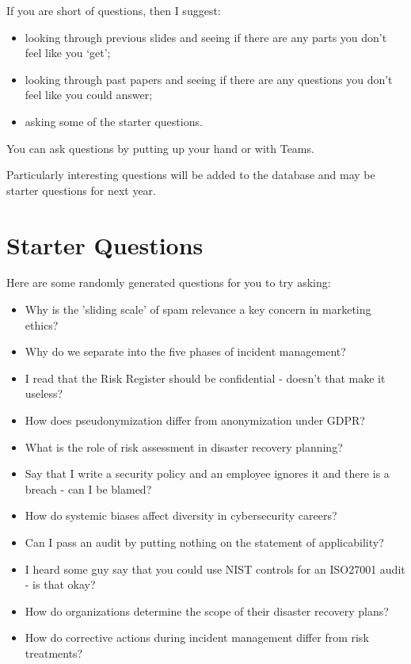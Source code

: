 \documentclass[12pt]{article}
\begin{document}
If you are short of questions, then I suggest: 

\begin{itemize} 
\item looking through previous slides and seeing if there are any parts you don't feel like you `get';
\item looking through past papers and seeing if there are any questions you don't feel like you could answer;
\item asking some of the starter questions.
\end{itemize} 

You can ask questions by putting up your hand or with Teams.  

Particularly interesting questions will be added to the database and may be starter questions for next year.  

\section*{Starter Questions} 
Here are some randomly generated questions for you to try asking: 

\begin{itemize}
  \item Why is the 'sliding scale' of spam relevance a key concern in marketing ethics?
  \item Why do we separate into the five phases of incident management?
  \item I read that the Risk Register should be confidential - doesn't that make it useless?
  \item How does pseudonymization differ from anonymization under GDPR?
  \item What is the role of risk assessment in disaster recovery planning?
  \item Say that I write a security policy and an employee ignores it and there is a breach - can I be blamed?
  \item How do systemic biases affect diversity in cybersecurity careers?
  \item Can I pass an audit by putting nothing on the statement of applicability?
  \item I heard some guy say that you could use NIST controls for an ISO27001 audit - is that okay?
  \item How do organizations determine the scope of their disaster recovery plans?
  \item How do corrective actions during incident management differ from risk treatments?
\end{itemize}


%
%



\end{document}
